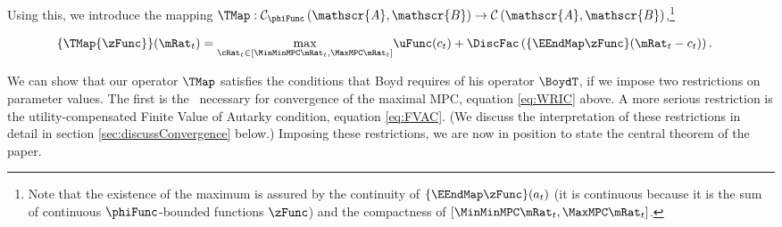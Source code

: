 \documentclass[BufferStockTheory]{subfiles}
\begin{document}
Using this, we introduce the mapping \textit{$\TMap:\mathcal{C}_{\phiFunc }\left( \mathscr{A},\mathscr{B}\right) \rightarrow \mathcal{C}\left(
    \mathscr{A},\mathscr{B}\right) $},\footnote{Note that the existence of the maximum is assured by the continuity of $\{\EEndMap \zFunc\}(a_{t})$ (it is continuous because it is the sum of continuous $\phiFunc$-bounded functions $\zFunc$) and the compactness of $[\MinMinMPC \mRat_{t},  \MaxMPC \mRat_{t}]$.}
\begin{comment} %
  (In the subtle case when $\MinMinMPC=0$, the compact interval could be revised as $ [(\MinMinMPC+\epsilon) \mRat_{t},
  \MaxMPC \mRat_{t}]$ where $\epsilon$ is a very small positive number because obviously $\MinMinMPC \mRat_{t}=0$ will not be the $\argmax$)
\end{comment}
\begin{equation}\begin{gathered}\begin{aligned}
  \{\TMap{\zFunc}\}(\mRat_{t})  & = \underset{{\cRat}_{t} \in
                                  [\MinMinMPC \mRat_{t}, \MaxMPC \mRat_{t}]
                                  } \max
                                  \uFunc(c_{t})+\DiscFac \left( \{\EEndMap \zFunc \}(\mRat_{t}-c_{t}) \right)  \label{definitionmappingT}.
\end{aligned}\end{gathered}\end{equation}


\begin{comment}
  Unpacking the definitions, our mapping $\TMap$ can be written more explicitly as
  \begin{equation}\begin{gathered}\begin{aligned}
    \{\TMap\zFunc\}(\mRat_{t})  & = \underset{\cRat_{t} \in [\MinMinMPC
                                  \mRat_{t}, \MaxMPC \mRat_{t}]} \max \left\{
                                  \uFunc(c_{t})+\DiscFac \Ex_{t}\left[ {\PGro}_{t+1} ^{1-\CRRA }\zFunc(
                                  {\aRat}_{t}\Rnorm_{t+1}+\tShkAll_{t+1}) \right] \right\}
                                  .
  \end{aligned}\end{gathered}\end{equation}
\end{comment}

\hypertarget{Contraction-Conditions}{}

We can show that our operator $\TMap$ satisfies the conditions that
Boyd requires of his operator $\BoydT$, if we impose two restrictions
on parameter values.  The first is the \WRIC~necessary for
convergence of the maximal MPC, equation \eqref{eq:WRIC} above.  A
more serious restriction is the utility-compensated Finite Value of
Autarky condition, equation \eqref{eq:FVAC}.  (We discuss the
interpretation of these restrictions in detail in section
\ref{sec:discussConvergence} below.)  Imposing these restrictions, we
are now in position to state the central theorem of the paper.
\end{document}
